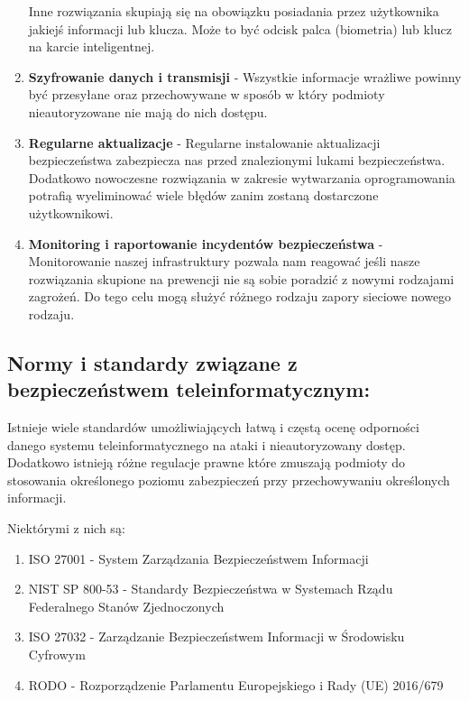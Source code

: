 \documentclass[12pt,a4paper]{article}
\begin{document}
\begin{enumerate}
        Inne rozwiązania skupiają się na obowiązku posiadania przez użytkownika 
        jakiejś informacji lub klucza. Może to być odcisk palca (biometria) lub 
        klucz na karcie inteligentnej.
    \item \textbf{Szyfrowanie danych i transmisji} - Wszystkie informacje
      wrażliwe powinny być przesyłane oraz przechowywane w sposób w który
      podmioty nieautoryzowane nie mają do nich dostępu.
    \item \textbf{Regularne aktualizacje} - Regularne instalowanie aktualizacji
      bezpieczeństwa zabezpiecza nas przed znalezionymi lukami bezpieczeństwa.
      Dodatkowo nowoczesne rozwiązania w zakresie wytwarzania oprogramowania
      potrafią wyeliminować wiele błędów zanim zostaną dostarczone
      użytkownikowi.
    \item \textbf{Monitoring i raportowanie incydentów bezpieczeństwa} -
      Monitorowanie naszej infrastruktury pozwala nam reagować jeśli nasze
      rozwiązania skupione na prewencji nie są sobie poradzić z nowymi rodzajami
      zagrożeń. Do tego celu mogą służyć różnego rodzaju zapory sieciowe nowego
      rodzaju.
\end{enumerate}

\subsection{Normy i standardy związane z bezpieczeństwem teleinformatycznym:}

Istnieje wiele standardów umożliwiających łatwą i częstą ocenę odporności danego
systemu teleinformatycznego na ataki i nieautoryzowany dostęp. Dodatkowo
istnieją różne regulacje prawne które zmuszają podmioty do stosowania
określonego poziomu zabezpieczeń przy przechowywaniu określonych informacji.

Niektórymi z nich są:

\begin{enumerate}
  \item ISO 27001 - System Zarządzania Bezpieczeństwem Informacji
  \item NIST SP 800-53 - Standardy Bezpieczeństwa w Systemach Rządu Federalnego Stanów Zjednoczonych
  \item ISO 27032 - Zarządzanie Bezpieczeństwem Informacji w Środowisku Cyfrowym
  \item RODO - Rozporządzenie Parlamentu Europejskiego i Rady (UE) 2016/679
\end{enumerate}
\end{document}
